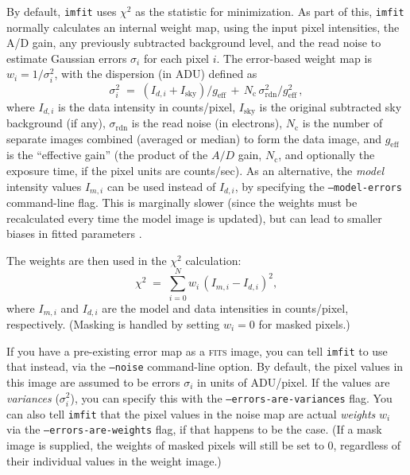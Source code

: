 \documentclass[10pt,a4paper,article]{memoir}
\newcommand{\imfit}{\texttt{imfit}}
\newcommand{\chisquare}{\ensuremath{\chi^{2}}}
\begin{document}
By default, \imfit{} uses \chisquare{} as the statistic for
minimization. As part of this, \imfit{} normally calculates an internal
weight map, using the input pixel intensities, the A/D gain, any
previously subtracted background level, and the read noise to estimate
Gaussian errors $\sigma_{i}$ for each pixel $i$. The error-based weight
map is $w_{i} = 1/\sigma^{2}_{i}$, with the dispersion (in ADU) defined as
\begin{equation}
\sigma^{2}_{i} \; = \; (I_{d, i} + I_{\mathrm{sky}})/g_{\mathrm{eff}} \, + \, N_{\mathrm{c}} \, \sigma_{\mathrm{rdn}}^{2}/g_{\mathrm{eff}}^{2} \, ,
\end{equation}
where $I_{d, i}$ is the data intensity in counts/pixel,
$I_{\mathrm{sky}}$ is the original subtracted sky background (if any),
$\sigma_{\mathrm{rdn}}$ is the read noise (in electrons),
$N_{\mathrm{c}}$ is the number of separate images combined (averaged or
median) to form the data image, and $g_{\mathrm{eff}}$ is the
``effective gain'' (the product of the $A/D$ gain,  $N_{\mathrm{c}}$,
and optionally the exposure time, if the pixel units are counts/sec).
As an alternative, the \textit{model} intensity values $I_{m, i}$ can be
used instead of $I_{d, i}$, by specifying the \texttt{--model-errors}
command-line flag. This is marginally slower (since the weights must be
recalculated every time the model image is updated), but can lead to
smaller biases in fitted parameters \citep[see][]{humphrey09,erwin14}.

The weights are then used in the \chisquare{} calculation:
\begin{equation}
\chisquare \; = \; \sum_{i = 0}^{N} w_{i} \, (I_{m, i} - I_{d, i})^2 ,
\end{equation}
where $I_{m, i}$ and $I_{d, i}$ are the model and data intensities
in counts/pixel, respectively. (Masking is handled by setting $w_{i} = 0$
for masked pixels.)

If you have a pre-existing error map as a \textsc{fits} image, you can tell \imfit{} to
use that instead, via the \texttt{--noise} command-line option. By default, the
pixel values in this image are assumed to be errors $\sigma_{i}$ in units of
ADU/pixel. If the values are \textit{variances} ($\sigma_{i}^2$), you can specify
this with the \texttt{--errors-are-variances} flag. You can also tell \imfit{}
that the pixel values in the noise map are actual \textit{weights} $w_{i}$ via the
\texttt{--errors-are-weights} flag, if that happens to be the case. (If a mask
image is supplied, the weights of masked pixels will still be set to 0,
regardless of their individual values in the weight image.)
\end{document}
